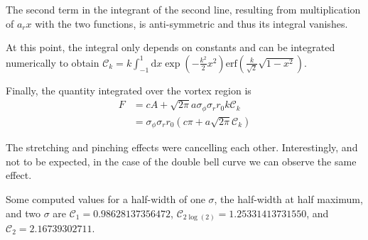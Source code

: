 \documentclass[a4paper]{scrartcl}
\begin{document}
The second term in the integrant of the second line, resulting from multiplication of $a_r x$ with the two functions,
is anti-symmetric and thus its integral vanishes.

At this point, the integral only depends on constants and can be integrated numerically to obtain $\mathcal{C}_k = k \int_{-1}^{1} \mathrm{d}x \exp\left( - \frac{k^2}{2} x^2\right)
  \mathrm{erf} \left( \frac{k}{\sqrt{2}} \sqrt{1 - x^2} \right)$.

Finally, the quantity integrated over the vortex region is
\begin{align}
  F & = c A + \sqrt{2\pi} a \sigma_\phi \sigma_r r_0 k \mathcal{C}_k                \\
    & = \sigma_\phi \sigma_r r_0 \left( c \pi + a \sqrt{2\pi} \mathcal{C}_k \right)
\end{align}

The stretching and pinching effects were cancelling each other.
Interestingly, and not to be expected, in the case of the double bell curve we can observe the same effect.

Some computed values for a half-width of one $\sigma$, the half-width at half maximum,
and two $\sigma$ are $\mathcal{C}_1 = 0.98628137356472$,
$\mathcal{C}_{2\log(2)} = 1.25331413731550$, and $\mathcal{C}_2 = 2.16739302711$.
\end{document}
